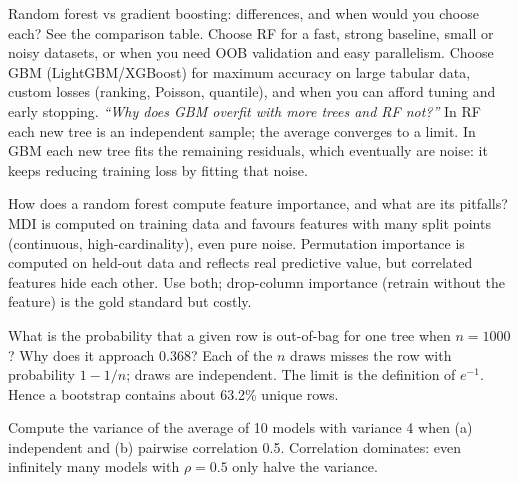\begin{qa}{ Random forest vs gradient boosting: differences, and when would you choose each?}
\why See the comparison table. Choose RF for a fast, strong baseline, small or noisy datasets, or when you need OOB validation and
easy parallelism. Choose GBM (LightGBM/XGBoost) for maximum accuracy on large tabular data, custom losses (ranking, Poisson,
quantile), and when you can afford tuning and early stopping.
\pushes \emph{``Why does GBM overfit with more trees and RF not?''} In RF each new tree is an independent sample; the average
converges to a limit. In GBM each new tree fits the remaining residuals, which eventually are noise: it keeps reducing training loss
by fitting that noise.
\end{qa}

\begin{qa}{ How does a random forest compute feature importance, and what are its
pitfalls?}
\why MDI is computed on training data and favours features with many split points (continuous, high-cardinality), even pure noise.
Permutation importance is computed on held-out data and reflects real predictive value, but correlated features hide each other.
Use both; drop-column importance (retrain without the feature) is the gold standard but costly.
\end{qa}

\begin{qa}{What is the probability that a given row is out-of-bag for one tree when $n = 1000$? Why does it approach 0.368?}
\why Each of the $n$ draws misses the row with probability $1 - 1/n$; draws are independent. The limit is the definition of $e^{-1}$.
Hence a bootstrap contains about 63.2\% unique rows.
\end{qa}

\begin{qa}{Compute the variance of the average of 10 models with variance 4 when (a) independent and (b) pairwise correlation 0.5.}
\why Correlation dominates: even infinitely many models with $\rho = 0.5$ only halve the variance.
\end{qa}

